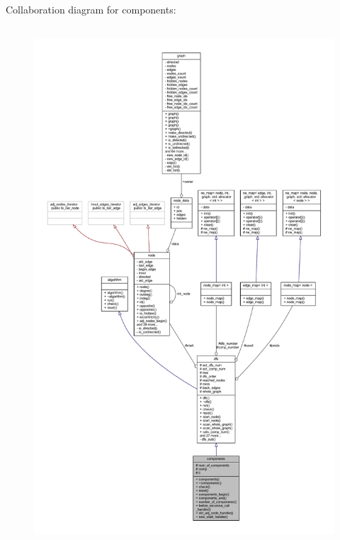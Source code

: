 Collaboration diagram for components\+:\nopagebreak
\begin{figure}[H]
\begin{center}
\leavevmode
\includegraphics[height=550pt]{classcomponents__coll__graph}
\end{center}
\end{figure}

